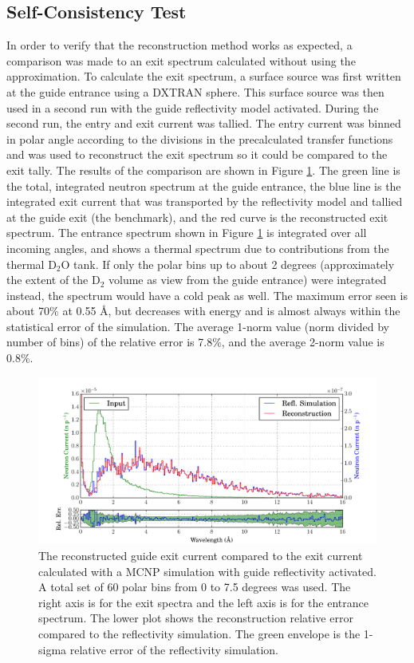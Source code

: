 \documentclass[preprint,12pt]{elsarticle}
\begin{document}
\subsection{Self-Consistency Test}

In order to verify that the reconstruction method works as expected, a comparison was made to an exit spectrum calculated without using the approximation.  To calculate the exit spectrum, a surface source was first written at the guide entrance using a DXTRAN sphere. This surface source was then used in a second run with the guide reflectivity model activated.  During the second run, the entry and exit current was tallied.  The entry current was binned in polar angle according to the divisions in the precalculated transfer functions and was used to reconstruct the exit spectrum so it could be compared to the exit tally.   The results of the comparison are shown in Figure \ref{xfer_bench}.  The green line is the total, integrated neutron spectrum at the guide entrance, the blue line is the integrated exit current that was transported by the reflectivity model and tallied at the guide exit (the benchmark), and the red curve is the reconstructed exit spectrum.  The entrance spectrum shown in Figure \ref{xfer_bench} is integrated over all incoming angles, and shows a thermal spectrum due to contributions from the thermal D$_2$O tank.  If only the polar bins up to about 2 degrees (approximately the extent of the D$_2$ volume as view from the guide entrance) were integrated instead, the spectrum would have a cold peak as well.   The maximum error seen is about 70\% at 0.55 \AA{}, but decreases with energy and is almost always within the statistical error of the simulation.  The average 1-norm value (norm divided by number of bins) of the relative error is 7.8\%, and the average 2-norm value is 0.8\%.

\begin{figure}
\begin{center}
\includegraphics[scale=0.4]{graphics/xfer_bench.pdf}
\end{center}
\caption{\label{xfer_bench}The reconstructed guide exit current compared to the exit current calculated with a MCNP simulation with guide reflectivity activated.  A total set of 60 polar bins from 0 to 7.5 degrees was used.  The right axis is for the exit spectra and the left axis is for the entrance spectrum.  The lower plot shows the reconstruction relative error compared to the reflectivity simulation.  The green envelope is the 1-sigma relative error of the reflectivity simulation.}
\end{figure}
\end{document}
